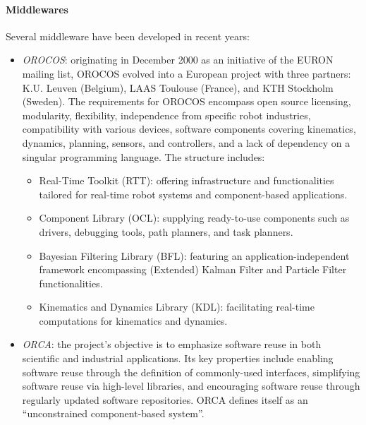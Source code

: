 \paragraph*{Middlewares}
Several middleware have been developed in recent years:
\begin{itemize}
    \item \textit{OROCOS}: originating in December 2000 as an initiative of the EURON mailing list, OROCOS evolved into a European project with three partners: K.U. Leuven (Belgium), LAAS Toulouse (France), and KTH Stockholm (Sweden).
        The requirements for OROCOS encompass open source licensing, modularity, flexibility, independence from specific robot industries, compatibility with various devices, software components covering kinematics, dynamics, planning, sensors, and controllers, and a lack of dependency on a singular programming language.
        The structure includes:
        \begin{itemize}
            \item Real-Time Toolkit (RTT): offering infrastructure and functionalities tailored for real-time robot systems and component-based applications.
            \item Component Library (OCL): supplying ready-to-use components such as drivers, debugging tools, path planners, and task planners.
            \item Bayesian Filtering Library (BFL): featuring an application-independent framework encompassing (Extended) Kalman Filter and Particle Filter functionalities.
            \item Kinematics and Dynamics Library (KDL): facilitating real-time computations for kinematics and dynamics.
        \end{itemize}
    \item \textit{ORCA}: the project's objective is to emphasize software reuse in both scientific and industrial applications. 
        Its key properties include enabling software reuse through the definition of commonly-used interfaces, simplifying software reuse via high-level libraries, and encouraging software reuse through regularly updated software repositories. 
        ORCA defines itself as an ``unconstrained component-based system''.
        

\end{itemize}
